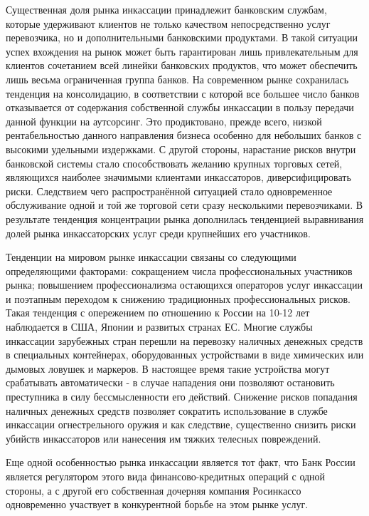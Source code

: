 \documentclass[a4paper,12pt,fleqn]{article} %
\begin{document}
Существенная доля рынка инкассации принадлежит банковским службам, которые удерживают клиентов не только качеством непосредственно услуг перевозчика, но и дополнительными банковскими продуктами. В такой ситуации успех вхождения на рынок может быть гарантирован лишь привлекательным для клиентов сочетанием всей линейки банковских продуктов, что может обеспечить лишь весьма ограниченная группа банков. На современном рынке сохранилась тенденция на консолидацию, в соответствии с которой все большее число банков отказывается от содержания собственной службы инкассации в пользу передачи данной функции на аутсорсинг. Это продиктовано, прежде всего, низкой рентабельностью данного направления бизнеса особенно для небольших банков с высокими удельными издержками. С другой стороны, нарастание рисков внутри банковской системы стало способствовать желанию крупных торговых сетей, являющихся наиболее значимыми клиентами инкассаторов, диверсифицировать риски. Следствием чего распространённой ситуацией стало одновременное обслуживание одной и той же торговой сети сразу несколькими перевозчиками. В результате тенденция концентрации рынка дополнилась тенденцией выравнивания долей рынка инкассаторских услуг среди крупнейших его участников.

Тенденции на мировом рынке инкассации связаны со следующими  определяющими факторами: сокращением числа профессиональных участников рынка; повышением профессионализма остающихся операторов услуг инкассации и поэтапным переходом к снижению традиционных профессиональных рисков. Такая тенденция с опережением по отношению к России на 10-12 лет наблюдается в США, Японии и развитых странах ЕС. Многие службы инкассации зарубежных стран перешли на перевозку наличных денежных средств в специальных контейнерах, оборудованных устройствами в виде химических или дымовых ловушек и маркеров. В настоящее время такие устройства могут срабатывать автоматически - в случае нападения они позволяют остановить преступника в силу бессмысленности его действий. Снижение рисков попадания наличных денежных средств позволяет сократить использование в службе инкассации огнестрельного оружия и как следствие, существенно снизить риски убийств инкассаторов или нанесения им тяжких телесных повреждений. 

Еще одной особенностью рынка инкассации является тот факт, что Банк России является регулятором этого вида финансово-кредитных операций с одной стороны, а с другой его собственная дочерняя компания Росинкассо одновременно участвует в конкурентной борьбе на этом рынке услуг.
\end{document}
